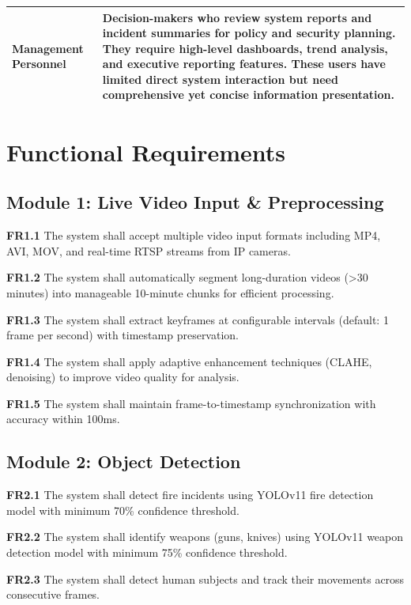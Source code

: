 \documentclass[12pt,a4paper]{article}
\begin{document}
\begin{table}[h!]
{\begin{tabular}{p{} p{}}
\textbf{Management Personnel} & Decision-makers who review system reports and incident summaries for policy and security planning. They require high-level dashboards, trend analysis, and executive reporting features. These users have limited direct system interaction but need comprehensive yet concise information presentation. \\ \hline

\end{tabular}%
}
\end{table}

\clearpage

\section{Functional Requirements}

\subsection{Module 1: Live Video Input \& Preprocessing}
\textbf{FR1.1} The system shall accept multiple video input formats including MP4, AVI, MOV, and real-time RTSP streams from IP cameras.

\textbf{FR1.2} The system shall automatically segment long-duration videos (>30 minutes) into manageable 10-minute chunks for efficient processing.

\textbf{FR1.3} The system shall extract keyframes at configurable intervals (default: 1 frame per second) with timestamp preservation.

\textbf{FR1.4} The system shall apply adaptive enhancement techniques (CLAHE, denoising) to improve video quality for analysis.

\textbf{FR1.5} The system shall maintain frame-to-timestamp synchronization with accuracy within 100ms.

\subsection{Module 2: Object Detection}
\textbf{FR2.1} The system shall detect fire incidents using YOLOv11 fire detection model with minimum 70\% confidence threshold.

\textbf{FR2.2} The system shall identify weapons (guns, knives) using YOLOv11 weapon detection model with minimum 75\% confidence threshold.

\textbf{FR2.3} The system shall detect human subjects and track their movements across consecutive frames.
\end{document}
